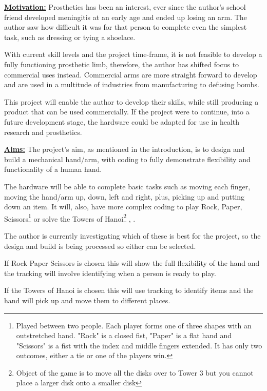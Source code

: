 \documentclass[progress]{cmpreport}
\begin{document}
\textbf{\underline{Motivation:}} Prosthetics has been an interest, ever since the author's school friend developed meningitis at an early age and ended up losing an arm. The author saw how difficult it was for that person to complete even the simplest task, such as dressing or tying a shoelace. 

With current skill levels and the project time-frame, it is not feasible to develop a fully functioning prosthetic limb, therefore, the author has shifted focus to commercial uses instead. Commercial arms are more straight forward to develop and are used in a multitude of industries from manufacturing to defusing bombs. 

This project will enable the author to develop their skills, while still producing a product that can be used commercially. If the project were to continue, into a future development stage, the hardware could be adapted for use in health research and prosthetics. \newline

\noindent\textbf{\underline{Aims:}} The project's aim, as mentioned in the introduction, is to design and build a mechanical hand/arm, with coding to fully demonstrate flexibility and functionality of a human hand. 

The hardware will be able to complete basic tasks such as moving each finger, moving the hand/arm up, down, left and right, plus, picking up and putting down an item. It will, also, have more complex coding to play Rock, Paper, Scissors\footnote{Played between two people. Each player forms one of three shapes with an outstretched hand. "Rock" is a closed fist, "Paper" is a flat hand and "Scissors" is a fist with the index and middle fingers extended. It has only two outcomes, either a tie or one of the players win.} or solve the Towers of Hanoi\footnote{Object of the game is to move all the disks over to Tower 3 but you cannot place a larger disk onto a smaller disk} \citep{DBLP:conf/case/ItoSYI16}, \citep{DBLP:journals/corr/abs-cs-0612070}.  

The author is currently investigating which of these is best for the project, so the design and build is being processed so either can be selected.

If Rock Paper Scissors is chosen this will show the full flexibility of the hand and the tracking will involve identifying when a person is ready to play.

If the Towers of Hanoi is chosen this will use tracking to identify items and the hand will pick up and move them to different places.
\end{document}
